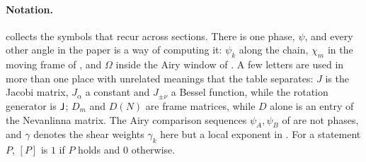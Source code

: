 \paragraph{Notation.}  collects the symbols that recur across sections.
There is one phase, $\psi$, and every other angle in the paper is a way of computing it:
$\psi_k$ along the chain, $\chi_m$ in the moving frame of , and $\Omega$
inside the Airy window of . A few letters are used in more than one place with
unrelated meanings that the table separates: $J$ is the Jacobi matrix, $J_\alpha$ a constant and $J_{\pm\nu}$
a Bessel function, while the rotation generator is $\mathsf{J}$; $D_m$ and $D(N)$ are frame matrices, while $D$
alone is an entry of the Nevanlinna matrix. The Airy comparison sequences $\psi_A,\psi_B$ of
 are not phases, and $\gamma$ denotes the shear weights $\gamma_k$ here but a local exponent
in . For a statement $P$, $[P]$ is $1$ if $P$ holds and $0$ otherwise.

